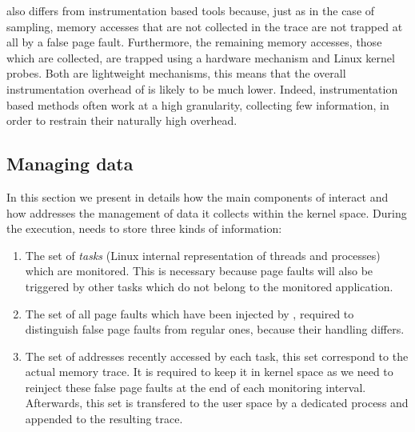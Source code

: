 \Moca also differs from instrumentation based tools because, just as in the case of sampling,
memory accesses that are not collected in the trace are not trapped at all by a false page fault. Furthermore, the
remaining memory accesses, those which are collected, are trapped using a hardware mechanism and
Linux kernel probes. Both are lightweight mechanisms, this means that
the overall instrumentation overhead of \Moca is likely to be much lower.
Indeed, instrumentation based methods often work at a high granularity, collecting few information,
in order to restrain their naturally high overhead.



\subsection{Managing data}
\label{sec:design-tech}

In this section we present in details how the main components of \Moca
interact and how \Moca addresses the management of data it collects
within the kernel space.
During the execution, \Moca needs to store three kinds of information:
\begin{enumerate}
    \item The set of \emph{tasks} (Linux internal representation of threads and processes) which are
monitored. This is necessary because page faults will also be triggered by other tasks which do not belong to
the monitored application.
    \item The set of all page faults which have been injected by \Moca,
        required to distinguish false page faults from regular ones, because their handling differs.
    \item The set of addresses recently accessed by each task, this set
        correspond to the actual memory trace. It is required to keep it in
        kernel space as we need to reinject these false page faults at the end of each monitoring interval. Afterwards,
        this set is transfered to the user space by a dedicated process and appended to the resulting trace.
\end{enumerate}

